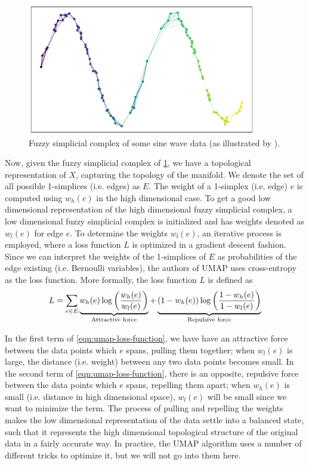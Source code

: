 \begin{figure}[H]
    \centering
    \includegraphics[width=10cm]{thesis/figures/how_umap_works_umap_graph.png}
    \caption{Fuzzy simplicial complex of some sine wave data (as illustrated by \cite{how-umap-works-2018}).}
    \label{fig:how_umap_works_umap_graph}
\end{figure}
Now, given the fuzzy simplicial complex of \cref{fig:how_umap_works_umap_graph}, we have a topological representation of $X$, capturing the topology of the manifold. We denote the set of all possible 1-simplices (i.e. edges) as $E$. The weight of a 1-simplex (i.e. edge) $e$ is computed using $w_h(e)$ in the high dimensional case. To get a good low dimensional representation of the high dimensional fuzzy simplicial complex, a low dimensional fuzzy simplicial complex is initialized and has weights denoted as $w_l(e)$ for edge $e$. To determine the weights $w_l(e)$, an iterative process is employed, where a loss function $L$ is optimized in a gradient descent fashion. Since we can interpret the weights of the 1-simplices of $E$ as probabilities of the edge existing (i.e. Bernoulli variables), the authors of UMAP uses cross-entropy as the loss function. More formally, the loss function $L$ is defined as
\begin{align}
    L = \sumlim{e \in E}{} \undertext{w_h(e) \log \enclp{\frac{w_h(e)}{w_l(e)}}}{Attractive force} + \undertext{(1 - w_h(e)) \log \enclp{\frac{1 - w_h(e)}{1 - w_l(e)}}}{Repulsive force}
    \label{eqn:umap-loss-function}
\end{align}

In the first term of \cref{eqn:umap-loss-function}, we have have an attractive force between the data points which $e$ spans, pulling them together; when $w_l(e)$ is large, the distance (i.e. weight) between any two data points becomes small. In the second term of \cref{eqn:umap-loss-function}, there is an opposite, repulsive force between the data points which $e$ spans, repelling them apart; when $w_h(e)$ is small (i.e. distance in high dimensional space), $w_l(e)$ will be small since we want to minimize the term. The process of pulling and repelling the weights makes the low dimensional representation of the data settle into a balanced state, such that it represents the high dimensional topological structure of the original data in a fairly accurate way. In practice, the UMAP algorithm uses a number of different tricks to optimize it, but we will not go into them here.